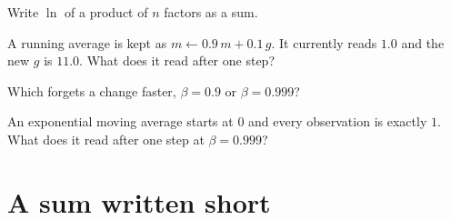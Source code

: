 \begin{quiz}
\item Write $\ln$ of a product of $n$ factors as a sum. 
\item A running average is kept as $m \leftarrow \num{0.9}\,m + \num{0.1}\,g$.
  It currently reads $\num{1.0}$ and the new $g$ is $\num{11.0}$. What does it
  read after one step? 
\item Which forgets a change faster, $\beta = \num{0.9}$ or
  $\beta = \num{0.999}$? 
\item An exponential moving average starts at $0$ and every observation is
  exactly $1$. What does it read after one step at $\beta = \num{0.999}$?
\end{quiz}

\section{A sum written short}
\label{sec:F04-sigma}

